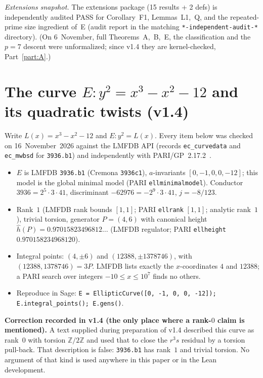 \documentclass[11pt,reqno]{amsart}
\theoremstyle{definition}
\begin{document}
\noindent\textit{Extensions snapshot.} The extensions package (15 results + 2 defs) is independently audited PASS for Corollary~F1, Lemmas~L1,~Q, and the repeated-prime size ingredient of~E (audit report in the matching \texttt{*-independent-audit-*} directory). (On 6~November, full Theorems~A,~B,~E, the classification and the \(p=7\) descent were unformalized; since v1.4 they are kernel-checked, Part~\ref{part:A}.)

\sloppy
\section{The curve \(E\colon y^2=x^3-x^2-12\) and its quadratic twists (v1.4)}
\label{sec:v14-curve}

Write \(L(x)=x^3-x^2-12\) and \(E\colon y^2=L(x)\). Every item below was checked on 16~November~2026 against the LMFDB API (records \texttt{ec\_curvedata} and \texttt{ec\_mwbsd} for \texttt{3936.b1}) and independently with PARI/GP~2.17.2~\cite{LMFDB,PARI}.

\begin{itemize}
\item \(E\) is LMFDB \texttt{3936.b1} (Cremona \texttt{3936c1}), \(a\)-invariants \([0,-1,0,0,-12]\); this model is the global minimal model (PARI \texttt{ellminimalmodel}). Conductor \(3936=2^5\cdot 3\cdot 41\), discriminant \(-62976=-2^9\cdot 3\cdot 41\), \(j=-8/123\).
\item Rank~\(1\) (LMFDB rank bounds \([1,1]\); PARI \texttt{ellrank} \([1,1]\); analytic rank~\(1\)), trivial torsion, generator \(P=(4,6)\) with canonical height \(\hat h(P)=0.97015823496812\ldots\) (LMFDB regulator; PARI \texttt{ellheight} \(0.970158234968120\)).
\item Integral points: \((4,\pm 6)\) and \((12388,\pm 1378746)\), with \((12388,1378746)=3P\). LMFDB lists exactly the \(x\)-coordinates \(4\) and \(12388\); a PARI search over integers \(-10\le x\le 10^7\) finds no others.
\item Reproduce in Sage: \texttt{E = EllipticCurve([0, -1, 0, 0, -12]); E.integral\_points(); E.gens()}.
\end{itemize}

\noindent\textbf{Correction recorded in v1.4 (the only place where a rank-\(0\) claim is mentioned).} A text supplied during preparation of v1.4 described this curve as rank~\(0\) with torsion \(\mathbb{Z}/2\mathbb{Z}\) and used that to close the \(r^3s\) residual by a torsion pull-back. That description is false: \texttt{3936.b1} has rank~\(1\) and trivial torsion. No argument of that kind is used anywhere in this paper or in the Lean development.
\end{document}
